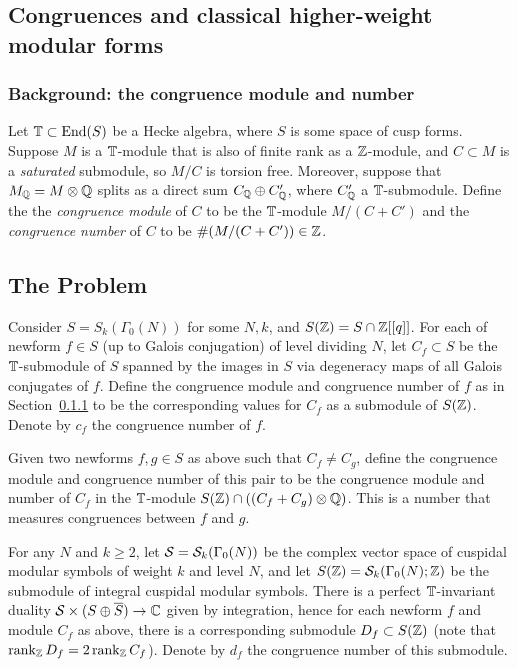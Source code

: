 \documentclass{article}
\begin{document}
\subsection{Congruences and classical higher-weight modular forms}

\subsubsection{Background: the congruence module and number}\label{sec:cong}
Let $\mathbb{T} \subset \operatorname{End}(S)$ be a Hecke algebra, where $S$ is some space
of cusp forms.  Suppose $M$ is a $\mathbb{T}$-module that is also of finite
rank as a $\mathbb{Z}$-module, and $C\subset M$ is a {\em saturated}
submodule, so $M/C$ is torsion free.  Moreover, suppose that $M_{\mathbb{Q}} =
M\otimes\mathbb{Q}$ splits as a direct sum $C_{\mathbb{Q}} \oplus C'_{\mathbb{Q}}$, where
$C'_{\mathbb{Q}}$ a $\mathbb{T}$-submodule.  Define the the {\em congruence module} of
$C$ to be the $\mathbb{T}$-module $M/(C+C')$ and the {\em congruence number}
of $C$ to be $\#(M/(C +C')) \in \mathbb{Z}$.  

\subsection{The Problem}

Consider $S=S_k(\Gamma_0(N))$ for some $N,k$, and $S(\mathbb{Z})=S\cap
\mathbb{Z}[[q]]$.  For each of newform $f\in S$ (up to Galois conjugation) of
level dividing $N$, let $C_f \subset S$ be the $\mathbb{T}$-submodule of $S$
spanned by the images in $S$ via degeneracy maps of all Galois
conjugates of $f$.  Define the congruence module and congruence number
of $f$ as in Section~\ref{sec:cong} to be the corresponding values for
$C_f$ as a submodule of $S(\mathbb{Z})$.  Denote by $c_f$ the congruence
number of $f$.

Given two newforms $f,g \in S$ as above such that $C_f \neq C_g$, define
the congruence module and congruence number of this pair to be
the congruence module and number of $C_f$ in the $\mathbb{T}$-module  
$S(\mathbb{Z})\cap((C_f + C_g)\otimes\mathbb{Q})$. This is a number that measures 
congruences between $f$ and $g$.

For any $N$ and $k\geq 2$, let $\mathcal{S} = \mathcal{S}_k(\Gamma_0(N))$ be the
complex vector space of cuspidal modular symbols of weight $k$ and
level $N$, and let $S(\mathbb{Z}) = \mathcal{S}_k(\Gamma_0(N);\mathbb{Z})$ be the submodule of
integral cuspidal modular symbols.  There is a perfect $\mathbb{T}$-invariant
duality $\mathcal{S} \times (S \oplus \overline{S}) \to \mathbb{C}$ given by
integration, hence for each newform $f$ and module $C_f$ as above,
there is a corresponding submodule $D_f \subset S(\mathbb{Z})$ (note that
$\operatorname{rank}_{\mathbb{Z}} D_f = 2\operatorname{rank}_{\mathbb{Z}} C_f$).  Denote by $d_f$ the congruence
number of this submodule.
\end{document}
